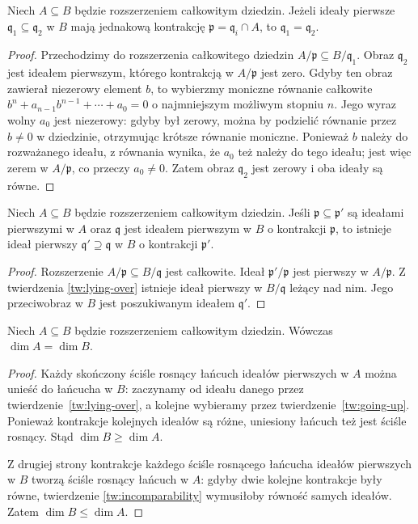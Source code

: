 \begin{twierdzenie}
\label{tw:incomparability}
Niech $A\subseteq B$ będzie rozszerzeniem całkowitym
dziedzin. Jeżeli ideały pierwsze $\mathfrak q_1
\subseteq\mathfrak q_2$ w $B$ mają jednakową
kontrakcję $\mathfrak p=\mathfrak q_i\cap A$,
to $\mathfrak q_1=\mathfrak q_2$.
\end{twierdzenie}
\begin{proof}
Przechodzimy do rozszerzenia całkowitego
dziedzin $A/\mathfrak p\subseteq B/\mathfrak q_1$.
Obraz $\mathfrak q_2$ jest ideałem pierwszym,
którego kontrakcją w $A/\mathfrak p$ jest zero.
Gdyby ten obraz zawierał niezerowy element $b$,
to wybierzmy moniczne równanie całkowite
$b^n+a_{n-1}b^{n-1}+\cdots+a_0=0$ o
najmniejszym możliwym stopniu $n$. Jego wyraz
wolny $a_0$ jest niezerowy: gdyby był zerowy,
można by podzielić równanie przez $b\ne0$ w
dziedzinie, otrzymując krótsze równanie moniczne.
Ponieważ $b$ należy do rozważanego ideału,
z równania wynika, że $a_0$ też należy do
tego ideału; jest więc zerem w $A/\mathfrak p$,
co przeczy $a_0\ne0$. Zatem obraz
$\mathfrak q_2$ jest zerowy i oba ideały są równe.
\end{proof}

\begin{twierdzenie}
\label{tw:going-up}
Niech $A\subseteq B$ będzie rozszerzeniem całkowitym
dziedzin. Jeśli $\mathfrak p\subseteq\mathfrak p'$
są ideałami pierwszymi w $A$ oraz $\mathfrak q$
jest ideałem pierwszym w $B$ o kontrakcji
$\mathfrak p$, to istnieje ideał pierwszy
$\mathfrak q'\supseteq\mathfrak q$ w $B$ o
kontrakcji $\mathfrak p'$.
\end{twierdzenie}
\begin{proof}
Rozszerzenie $A/\mathfrak p\subseteq B/\mathfrak q$
jest całkowite. Ideał $\mathfrak p'/\mathfrak p$
jest pierwszy w $A/\mathfrak p$. Z twierdzenia
\ref{tw:lying-over} istnieje ideał pierwszy w
$B/\mathfrak q$ leżący nad nim. Jego przeciwobraz
w $B$ jest poszukiwanym ideałem $\mathfrak q'$.
\end{proof}

\begin{wniosek}
\label{wn:dim-integral}
Niech $A\subseteq B$ będzie rozszerzeniem całkowitym
dziedzin. Wówczas $\dim A=\dim B$.
\end{wniosek}
\begin{proof}
Każdy skończony ściśle rosnący łańcuch
ideałów pierwszych w $A$ można unieść do
łańcucha w $B$: zaczynamy od ideału danego
przez twierdzenie~\ref{tw:lying-over}, a kolejne
wybieramy przez twierdzenie~\ref{tw:going-up}.
Ponieważ kontrakcje kolejnych ideałów są różne,
uniesiony łańcuch też jest ściśle rosnący.
Stąd $\dim B\ge\dim A$.

Z drugiej strony kontrakcje każdego ściśle
rosnącego łańcucha ideałów pierwszych w $B$
tworzą ściśle rosnący łańcuch w $A$: gdyby dwie
kolejne kontrakcje były równe, twierdzenie
\ref{tw:incomparability} wymusiłoby równość
samych ideałów. Zatem $\dim B\le\dim A$.
\end{proof}

